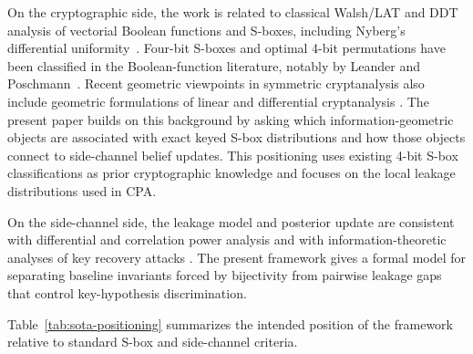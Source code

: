 \documentclass[referee,lineno,pdflatex,sn-mathphys-num]{sn-jnl}
\theoremstyle{thmstylethree}
\theoremstyle{thmstyletwo}
\theoremstyle{thmstyleone}
\begin{document}
On the cryptographic side, the work is related to classical Walsh/LAT and DDT
analysis of vectorial Boolean functions and S-boxes, including Nyberg's
differential uniformity~\cite{nyberg1994differentially}.  Four-bit S-boxes and
optimal 4-bit permutations have been classified in the Boolean-function
literature, notably by Leander and Poschmann~\cite{leander2007classification}.
Recent geometric viewpoints in symmetric cryptanalysis also include geometric
formulations of linear and differential cryptanalysis
\cite{beyne2021geometric,beyne2022quasidifferential}.
The present paper builds on this background by asking which
information-geometric objects are associated with exact keyed S-box
distributions and how those objects connect to side-channel belief updates.
This positioning uses existing 4-bit S-box classifications as prior
cryptographic knowledge and focuses on the local leakage distributions used in
CPA.

On the side-channel side, the leakage model and posterior update are consistent
with differential and correlation power analysis
\cite{kocher1999differential,brier2004correlation} and with
information-theoretic analyses of key recovery attacks
\cite{standaert2009unified,veyrat2009adaptive}.  The present framework gives a
formal model for separating baseline invariants forced by bijectivity from
pairwise leakage gaps that control key-hypothesis discrimination.

Table~\ref{tab:sota-positioning} summarizes the intended position of the
framework relative to standard S-box and side-channel criteria.
\end{document}
